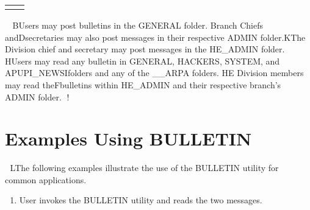 \begin{tabular} {lp{5.5in}}
 \end{tabular}  \normalsize    B Users may post bulletins in the GENERAL folder.  Branch Chiefs andD secretaries may also post messages in their respective ADMIN folder.K The Division chief and secretary may post messages in the HE\_ADMIN folder.    H Users may read any bulletin in GENERAL, HACKERS, SYSTEM, and APUPI\_NEWSI folders and any of the \_\_ARPA folders. HE Division members may read the F bulletins within HE\_ADMIN and their respective branch's ADMIN folder.   ! \section{Examples Using BULLETIN}    L The following examples illustrate the use of the BULLETIN utility for common
 applications.  \begin{enumerate} J \item User invokes the BULLETIN utility and reads the two messages.\\[2pt]    \smaller \tt 

\end{enumerate}
